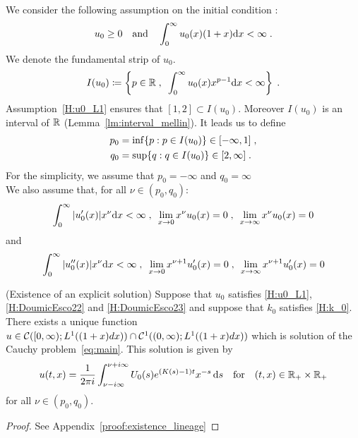\documentclass[11pt]{amsart}
\newcommand{\diff}{\,\mathrm{d}}
\begin{document}
    We consider the following assumption on the initial condition : 
    \begin{equation}
    u_0 \geq 0 \quad \text{and} \quad \int_0^\infty u_0(x) (1+x) \mathrm dx < \infty
    \; .
    \end{equation}
We denote the fundamental strip of $u_0$. 
\begin{equation}
    I(u_0) \coloneqq \left\{ p \in \mathbb{R} \; , \enspace \int_0^\infty u_0(x) x^{p-1} \mathrm dx < \infty \right\}
    \; .
\end{equation}
Assumption~\eqref{H:u0_L1} ensures that $[1, 2] \subset I(u_0)$. Moreover $I(u_0)$ is an interval of $\mathbb{R}$ (Lemma~\ref{lm:interval_mellin}). It leads us to define
\begin{subequations}
\begin{align*}
    p_0 &= \inf \{p : p \in I(u_0) \} \in [-\infty, 1] \; ,\\
    q_0 &= \sup \{q : q \in I(u_0) \} \in [2, \infty] \; .
\end{align*}    
\end{subequations}
For the simplicity, we assume that 
$ p_0=-\infty$ and $q_0 = \infty$ \\

We also assume that, for all $\nu \in (p_0, q_0)$:
\begin{equation}
    \int_0^\infty |u_0'(x)| x^\nu \mathrm dx < \infty
    \; , \enspace
    \lim_{x \to 0} x^\nu u_0(x) = 0
    \; , \enspace
    \lim_{x \to \infty} x^\nu u_0(x) = 0
    \label{H:DoumicEsco22}
\end{equation}
and 
\begin{equation}
    \int_0^\infty |u_0''(x)| x^\nu \mathrm dx < \infty
    \; , \enspace
    \lim_{x \to 0} x^{\nu + 1} u_0'(x) = 0
    \; , \enspace
    \lim_{x \to \infty} x^{\nu + 1} u_0'(x) = 0
    \label{H:DoumicEsco23}
\end{equation}

\begin{theorem}(Existence of an explicit solution) 
    \label{t:existence_lineage}
    Suppose that  $u_0$ satisfies \eqref{H:u0_L1}, \eqref{H:DoumicEsco22} and \eqref{H:DoumicEsco23} and suppose that $k_0$ satisfies \eqref{H:k_0}. 
    There exists a unique function $u \in \mathcal{C}([0, \infty); L^1((1+x)dx)) \cap \mathcal{C}^1((0, \infty); L^1((1+x)dx))$ which is solution of the Cauchy problem~\eqref{eq:main}. This solution is given by 
    \begin{equation}
        \label{eq:explicit_reconstruction}
        u(t,x) = \frac{1}{2\pi i} \int_{\nu-i\infty}^{\nu+i\infty} U_0(s) e^{(K(s)-1)t}x^{-s} \diff s 
        \mtext{for} (t,x) \in \RR_+ \times \RR_+
    \end{equation}
    for all $\nu \in (p_0, q_0)$.
    \end{theorem}
    \begin{proof}
        See Appendix~\ref{proof:existence_lineage}
    \end{proof}
\end{document}
